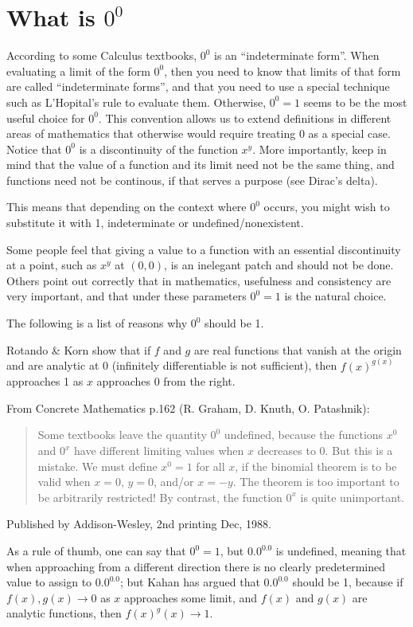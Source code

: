 \section{What is $0^0$}

According to some Calculus textbooks, $0^0$ is an ``indeterminate
form''. When evaluating a limit of the form $0^0$, then you need to know
that limits of that form are called ``indeterminate forms'', and that
you need to use a special technique such as L'Hopital's rule to evaluate
them. Otherwise, $0^0=1$ seems to be the most useful choice for
$0^0$. This convention allows us to extend definitions in different
areas of mathematics that otherwise would require treating 0 as a
special case. Notice that $0^0$ is a discontinuity of the function
$x^y$. More importantly, keep in mind that the value of a function and
its limit need not be the same thing, and functions need not be
continous, if that serves a purpose (see Dirac's delta).

This means that depending on the context where $0^0$ occurs, you might
wish to substitute it with 1, indeterminate or undefined/nonexistent.

Some people feel that giving a value to a function with an essential
discontinuity at a point, such as $x^y$ at $(0,0)$, is an inelegant
patch and should not be done. Others point out correctly that in
mathematics, usefulness and consistency are very important, and that
under these parameters $0^0=1$ is the natural choice.

The following is a list of reasons why $0^0$ should be 1.

Rotando \& Korn show that if $f$ and $g$ are real functions that vanish
at the origin and are analytic at 0 (infinitely differentiable is not
sufficient), then $f(x)^{g(x)}$ approaches 1 as $x$ approaches 0 from
the right.

From Concrete Mathematics p.162 (R. Graham, D. Knuth, O. Patashnik):
\begin{quote}
  Some textbooks leave the quantity $0^0$ undefined, because the
  functions $x^0$ and $0^x$ have different limiting values when $x$
  decreases to 0. But this is a mistake. We must define $x^0 = 1$ for
  all $x$, if the binomial theorem is to be valid when $x=0$, $y=0$,
  and/or $x=-y$.  The theorem is too important to be arbitrarily
  restricted! By contrast, the function $0^x$ is quite unimportant.
\end{quote}
Published by Addison-Wesley, 2nd printing Dec, 1988.

As a rule of thumb, one can say that $0^0 = 1$, but $0.0^{0.0}$ is
undefined, meaning that when approaching from a different direction
there is no clearly predetermined value to assign to $0.0^{0.0}$; but
Kahan has argued that $0.0^{0.0}$ should be 1, because if $f(x), g(x)
\rightarrow 0$ as $x$ approaches some limit, and $f(x)$ and $g(x)$ are
analytic functions, then $f(x)^g(x) \rightarrow 1$.


